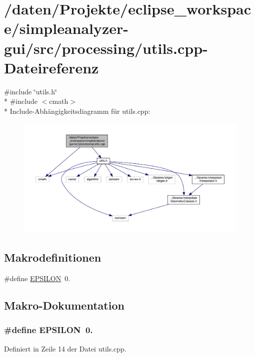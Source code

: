 \hypertarget{simpleanalyzer-gui_2src_2processing_2utils_8cpp}{\section{/daten/\-Projekte/eclipse\-\_\-workspace/simpleanalyzer-\/gui/src/processing/utils.cpp-\/\-Dateireferenz}
\label{simpleanalyzer-gui_2src_2processing_2utils_8cpp}
}
{\ttfamily \#include \char`\"{}utils.\-h\char`\"{}}\\*
{\ttfamily \#include $<$cmath$>$}\\*
Include-\/\-Abhängigkeitsdiagramm für utils.\-cpp\-:
\nopagebreak
\begin{figure}[H]
\begin{center}
\leavevmode
\includegraphics[width=350pt]{simpleanalyzer-gui_2src_2processing_2utils_8cpp__incl}
\end{center}
\end{figure}
\subsection*{Makrodefinitionen}
\begin{DoxyCompactItemize}
\item 
\#define \hyperlink{simpleanalyzer-gui_2src_2processing_2utils_8cpp_a002b2f4894492820fe708b1b7e7c5e70}{E\-P\-S\-I\-L\-O\-N}~0.
\end{DoxyCompactItemize}


\subsection{Makro-\/\-Dokumentation}
\hypertarget{simpleanalyzer-gui_2src_2processing_2utils_8cpp_a002b2f4894492820fe708b1b7e7c5e70}{
\subsubsection[{E\-P\-S\-I\-L\-O\-N}]{\setlength{\rightskip}{0pt plus 5cm}\#define E\-P\-S\-I\-L\-O\-N~0.}}\label{simpleanalyzer-gui_2src_2processing_2utils_8cpp_a002b2f4894492820fe708b1b7e7c5e70}


Definiert in Zeile 14 der Datei utils.\-cpp.

